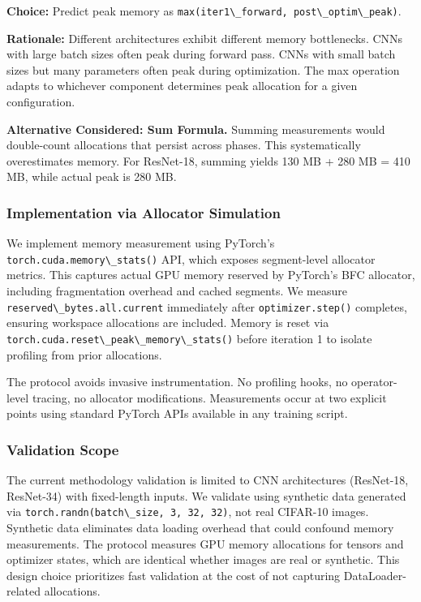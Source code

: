 \textbf{Choice:} Predict peak memory as \texttt{max(iter1\textbackslash \_forward, post\textbackslash \_optim\textbackslash \_peak)}.

\textbf{Rationale:} Different architectures exhibit different memory bottlenecks. CNNs with large batch sizes often peak during forward pass. CNNs with small batch sizes but many parameters often peak during optimization. The max operation adapts to whichever component determines peak allocation for a given configuration.

\textbf{Alternative Considered: Sum Formula.} Summing measurements would double-count allocations that persist across phases. This systematically overestimates memory. For ResNet-18, summing yields 130 MB + 280 MB = 410 MB, while actual peak is 280 MB.

\subsubsection{Implementation via Allocator Simulation}

We implement memory measurement using PyTorch's \texttt{torch.cuda.memory\textbackslash \_stats()} API, which exposes segment-level allocator metrics. This captures actual GPU memory reserved by PyTorch's BFC allocator, including fragmentation overhead and cached segments. We measure \texttt{reserved\textbackslash \_bytes.all.current} immediately after \texttt{optimizer.step()} completes, ensuring workspace allocations are included. Memory is reset via \texttt{torch.cuda.reset\textbackslash \_peak\textbackslash \_memory\textbackslash \_stats()} before iteration 1 to isolate profiling from prior allocations.

The protocol avoids invasive instrumentation. No profiling hooks, no operator-level tracing, no allocator modifications. Measurements occur at two explicit points using standard PyTorch APIs available in any training script.

\subsubsection{Validation Scope}

The current methodology validation is limited to CNN architectures (ResNet-18, ResNet-34) with fixed-length inputs. We validate using synthetic data generated via \texttt{torch.randn(batch\textbackslash \_size, 3, 32, 32)}, not real CIFAR-10 images. Synthetic data eliminates data loading overhead that could confound memory measurements. The protocol measures GPU memory allocations for tensors and optimizer states, which are identical whether images are real or synthetic. This design choice prioritizes fast validation at the cost of not capturing DataLoader-related allocations.

